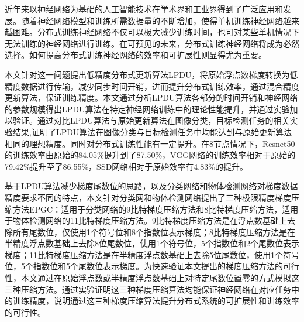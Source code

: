 \begin{cabstract}
近年来以神经网络为基础的人工智能技术在学术界和工业界得到了广泛应用和发展。随着神经网络模型和训练所需数据量的不断增加，使得单机训练神经网络越来越困难。分布式训练神经网络不仅可以极大减少训练时间，也可对某些单机情况下无法训练的神经网络进行训练。在可预见的未来，分布式训练神经网络将成为必然选择。如何提高分布式训练神经网络的效率和可扩展性则显得尤为重要。

本文针对这一问题提出低精度分布式更新算法LPDU，将原始浮点数梯度转换为低精度数据进行传输，减少同步时间开销，进而提升分布式训练效率，通过混合精度更新算法，保证训练精度。本文通过分析LPDU算法各部分的时间开销和神经网络的参数规模得出LPDU算法在特定神经网络训练中的理论性能提升，并通过实验加以验证。通过对比LPDU算法与原始更新算法在图像分类，目标检测任务的相关实验结果,证明了LPDU算法在图像分类与目标检测任务中均能达到与原始更新算法相同的理想精度。同时对分布式训练性能有一定提升。在8节点情况下，Resnet50的训练效率由原始的84.05\%提升到了87.50\%，VGG网络的训练效率相对于原始的79.42\%提升至了86.55\%，SSD网络相对于原始效率有4.83\%的提升。

基于LPDU算法减少梯度尾数位的思路，以及分类网络和物体检测网络对梯度数据精度要求不同的特点，本文针对分类网和物体检测网络提出了三种极限精度梯度压缩方法EPGC：适用于分类网络的9比特梯度压缩方法和8比特梯度压缩方法，适用于物体检测网络的11比特梯度压缩方法。9比特梯度压缩方法是在浮点数基础上去除所有尾数位，仅使用1个符号位和8个指数位表示梯度；8比特梯度压缩方法是在半精度浮点数基础上去除8位尾数位，使用1个符号位，5个指数位和2个尾数位表示梯度；11比特梯度压缩方法是在半精度浮点数基础上去除5位尾数位，使用1个符号位，5个指数位和5个尾数位表示梯度。为快速验证本文提出的梯度压缩方法的可行性，本文通过在原始浮点数或半精度浮点数基础上对特定尾数位置零的方式模拟这三种压缩方法。通过实验证明这三种梯度压缩算法均能保证神经网络在对应任务中的训练精度，说明通过这三种梯度压缩算法提升分布式系统的可扩展性和训练效率的可行性。

\end{cabstract}

